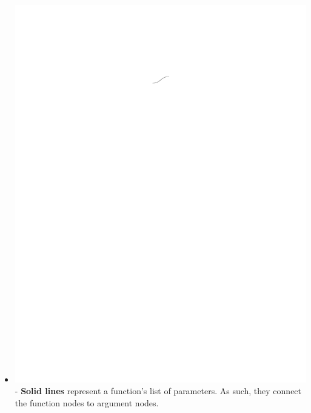 \documentclass[conference]{IEEEtran}
\begin{document}
\begin{itemize}
		\item  \vspace{.25cm} \includegraphics{glossary-solidline} - \textbf{Solid
			lines} represent a function's list of parameters. As such, they connect the
		function nodes to argument nodes.
		

\end{itemize}
\end{document}
